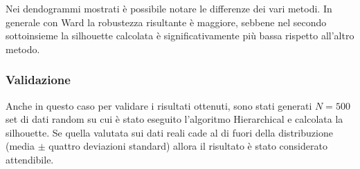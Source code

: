 \documentclass[a4paper,9pt]{article}
\begin{document}
Nei dendogrammi mostrati è possibile notare le differenze dei vari metodi. In generale con Ward la robustezza risultante
è maggiore, sebbene nel secondo sottoinsieme la silhouette calcolata è significativamente più bassa rispetto all'altro metodo.

\subsubsection{Validazione}
Anche in questo caso per validare i risultati ottenuti, sono stati generati $N=500$ set di dati random su cui è stato eseguito l'algoritmo Hierarchical e calcolata la silhouette. Se quella valutata sui dati reali cade al di fuori della distribuzione (media $ \pm $ quattro deviazioni standard) allora il risultato è stato considerato attendibile.
\end{document}
